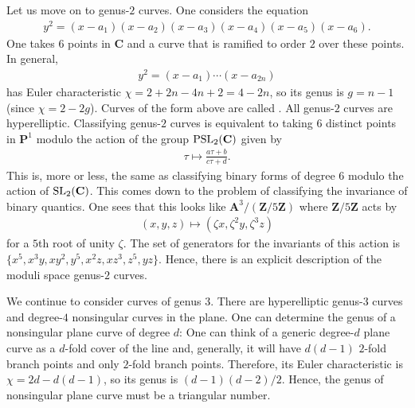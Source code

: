 \documentclass [11 pt, oneside] {article}
\begin{document}
Let us move on to genus-$2$ curves. One considers the equation
\begin{align*}
	y^2 = (x-a_1)(x-a_2)(x-a_3)(x-a_4) (x-a_5) (x-a_6).
\end{align*}
One takes $6$ points in $\mathbf{C}$ and a curve that is ramified to order $2$ over these points. In general,
\begin{align*}
	y^2 = (x-a_1)\cdots (x-a_{2n})
\end{align*}
has Euler characteristic $\chi = 2+2n-4n +2 = 4-2n$, so its genus is $g=n-1$ (since $\chi = 2-2g$). Curves of the form above are called . All genus-$2$ curves are hyperelliptic. Classifying genus-$2$ curves is equivalent to taking $6$ distinct points in $\mathbf{P}^1$ modulo the action of the group $\operatorname{PSL}_{2}(\mathbf{C})$ given by
\begin{align*}
	\tau \longmapsto \frac{a\tau+b}{c\tau+d}.
\end{align*}
This is, more or less, the same as classifying binary forms of degree $6$ modulo the action of $\operatorname{SL}_{2}(\mathbf{C})$. This comes down to the problem of classifying the invariance of binary quantics. One sees that this looks like $\mathbf{A}^3/(\mathbf{Z}/5\mathbf{Z})$ where $\mathbf{Z}/5\mathbf{Z}$ acts by
\begin{align*}
	(x,y,z) \longmapsto  (\zeta x,\zeta^2 y, \zeta^3 z)
\end{align*}
for a $5$th root of unity $\zeta$. The set of generators for the invariants of this action is $\{x^5,x^3y,xy^2,y^5,x^2z, xz^3, z^5, yz\}$. Hence, there is an explicit description of the moduli space genus-$2$ curves. 

We continue to consider curves of genus $3$. There are hyperelliptic genus-$3$ curves and degree-$4$ nonsingular curves in the plane. One can determine the genus of a nonsingular plane curve of degree $d$: One can think of a generic degree-$d$ plane curve as a $d$-fold cover of the line and, generally, it will have $d(d-1)$ $2$-fold branch points and only $2$-fold branch points. Therefore, its Euler characteristic is $\chi = 2d -  d(d-1)$, so its genus is $(d-1) (d-2)/2$. Hence, the genus of nonsingular plane curve must be a triangular number.
\end{document}
